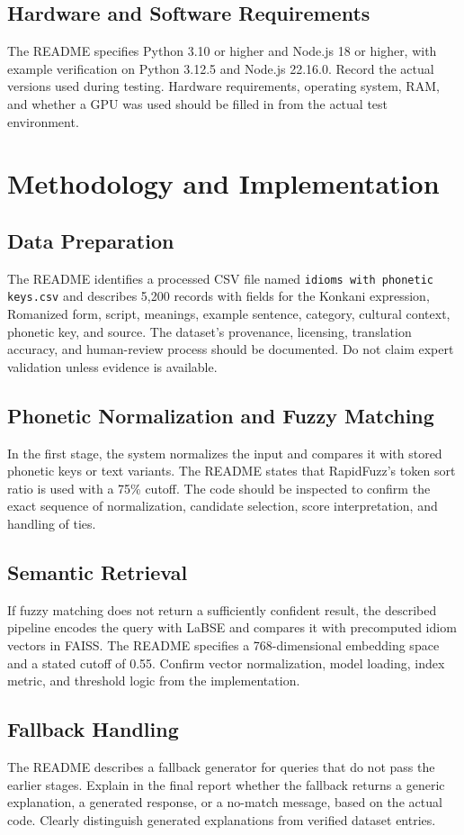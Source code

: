 \documentclass[12pt,a4paper]{report}
\begin{document}
\section{Hardware and Software Requirements}
The README specifies Python 3.10 or higher and Node.js 18 or higher, with example
verification on Python 3.12.5 and Node.js 22.16.0. Record the actual versions used
during testing. Hardware requirements, operating system, RAM, and whether a GPU
was used should be filled in from the actual test environment.
\chapter{Methodology and Implementation}

\section{Data Preparation}
The README identifies a processed CSV file named \texttt{idioms with phonetic
keys.csv} and describes 5,200 records with fields for the Konkani expression,
Romanized form, script, meanings, example sentence, category, cultural context,
phonetic key, and source. The dataset's provenance, licensing, translation
accuracy, and human-review process should be documented. Do not claim expert
validation unless evidence is available.

\section{Phonetic Normalization and Fuzzy Matching}
In the first stage, the system normalizes the input and compares it with stored
phonetic keys or text variants. The README states that RapidFuzz's token sort
ratio is used with a 75\% cutoff. The code should be inspected to confirm the
exact sequence of normalization, candidate selection, score interpretation, and
handling of ties.

\section{Semantic Retrieval}
If fuzzy matching does not return a sufficiently confident result, the described
pipeline encodes the query with LaBSE and compares it with precomputed idiom
vectors in FAISS. The README specifies a 768-dimensional embedding space and a
stated cutoff of 0.55. Confirm vector normalization, model loading, index metric,
and threshold logic from the implementation.

\section{Fallback Handling}
The README describes a fallback generator for queries that do not pass the earlier
stages. Explain in the final report whether the fallback returns a generic
explanation, a generated response, or a no-match message, based on the actual
code. Clearly distinguish generated explanations from verified dataset entries.
\end{document}
